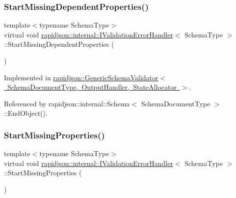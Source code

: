 \subsubsection{\texorpdfstring{StartMissingDependentProperties()}{StartMissingDependentProperties()}}
{\footnotesize\ttfamily template$<$typename Schema\+Type$>$ \\
virtual void \mbox{\hyperlink{classrapidjson_1_1internal_1_1_i_validation_error_handler}{rapidjson\+::internal\+::\+I\+Validation\+Error\+Handler}}$<$ Schema\+Type $>$\+::Start\+Missing\+Dependent\+Properties (\begin{DoxyParamCaption}{ }\end{DoxyParamCaption})\hspace{0.3cm}{\ttfamily [pure virtual]}}



Implemented in \mbox{\hyperlink{classrapidjson_1_1_generic_schema_validator_a4b376874448fc49abb14f88044ea6cde}{rapidjson\+::\+Generic\+Schema\+Validator$<$ Schema\+Document\+Type, Output\+Handler, State\+Allocator $>$}}.



Referenced by rapidjson\+::internal\+::\+Schema$<$ Schema\+Document\+Type $>$\+::\+End\+Object().

\mbox{\label{classrapidjson_1_1internal_1_1_i_validation_error_handler_a0fd6fed1e4200795bb7f0cc29e480596}} 
\subsubsection{\texorpdfstring{StartMissingProperties()}{StartMissingProperties()}}
{\footnotesize\ttfamily template$<$typename Schema\+Type$>$ \\
virtual void \mbox{\hyperlink{classrapidjson_1_1internal_1_1_i_validation_error_handler}{rapidjson\+::internal\+::\+I\+Validation\+Error\+Handler}}$<$ Schema\+Type $>$\+::Start\+Missing\+Properties (\begin{DoxyParamCaption}{ }\end{DoxyParamCaption})\hspace{0.3cm}{\ttfamily [pure virtual]}}



